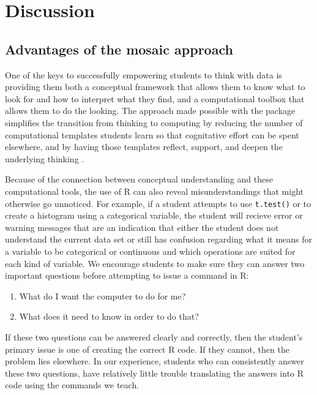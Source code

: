 \section{Discussion}\label{discussion}

\subsection{Advantages of the mosaic
approach}\label{advantages-of-the-mosaic-approach}

One of the keys to successfully empowering students to think with data
is providing them both a conceptual framework that allows them to know
what to look for and how to interpret what they find, and a
computational toolbox that allows them to do the looking. The approach
made possible with the  package simplifies the transition
from thinking to computing by reducing the number of computational
templates students learn so that cognitative effort can be spent
elsewhere, and by having those templates reflect, support, and deepen
the underlying thinking \citep{Grolemund:ISR:2014}.

Because of the connection between conceptual understanding and these
computational tools, the use of R can also reveal misunderstandings that
might otherwise go unnoticed. For example, if a student attempts to use
\texttt{t.test()} or to create a histogram using a categorical variable,
the student will recieve error or warning messages that are an
indication that either the student does not understand the current data
set or still has confusion regarding what it means for a variable to be
categorical or continuous and which operations are suited for each kind
of variable. We encourage students to make sure they can answer two
important questions before attempting to issue a command in R:

\begin{enumerate}
\def\labelenumi{\arabic{enumi}.}
\item
  What do I want the computer to do for me?
\item
  What does it need to know in order to do that?
\end{enumerate}

If these two questions can be answered clearly and correctly, then the
student's primary issue is one of creating the correct R code. If they
cannot, then the problem lies elsewhere. In our experience, students who
can consistently answer these two questions, have relatively little
trouble translating the answers into R code using the commands we teach.

